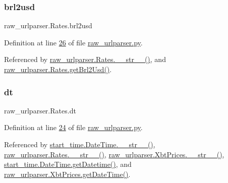 \subsubsection{\texorpdfstring{brl2usd}{brl2usd}}
{\footnotesize\ttfamily raw\+\_\+urlparser.\+Rates.\+brl2usd}



Definition at line \hyperlink{raw__urlparser_8py_source_l00026}{26} of file \hyperlink{raw__urlparser_8py_source}{raw\+\_\+urlparser.\+py}.



Referenced by \hyperlink{raw__urlparser_8py_source_l00038}{raw\+\_\+urlparser.\+Rates.\+\_\+\+\_\+str\+\_\+\+\_\+()}, and \hyperlink{raw__urlparser_8py_source_l00029}{raw\+\_\+urlparser.\+Rates.\+get\+Brl2\+Usd()}.

\mbox{\label{classraw__urlparser_1_1_rates_a09b3c7cb595f3135c3eda648b1bb4c3f}} 
\subsubsection{\texorpdfstring{dt}{dt}}
{\footnotesize\ttfamily raw\+\_\+urlparser.\+Rates.\+dt}



Definition at line \hyperlink{raw__urlparser_8py_source_l00024}{24} of file \hyperlink{raw__urlparser_8py_source}{raw\+\_\+urlparser.\+py}.



Referenced by \hyperlink{start__time_2____init_____8py_source_l00034}{start\+\_\+time.\+Date\+Time.\+\_\+\+\_\+str\+\_\+\+\_\+()}, \hyperlink{raw__urlparser_8py_source_l00038}{raw\+\_\+urlparser.\+Rates.\+\_\+\+\_\+str\+\_\+\+\_\+()}, \hyperlink{raw__urlparser_8py_source_l00074}{raw\+\_\+urlparser.\+Xbt\+Prices.\+\_\+\+\_\+str\+\_\+\+\_\+()}, \hyperlink{start__time_2____init_____8py_source_l00031}{start\+\_\+time.\+Date\+Time.\+get\+Datetime()}, and \hyperlink{raw__urlparser_8py_source_l00059}{raw\+\_\+urlparser.\+Xbt\+Prices.\+get\+Date\+Time()}.

\mbox{\label{classraw__urlparser_1_1_rates_acb05316e95a39bc42590a882712f854b}} 
